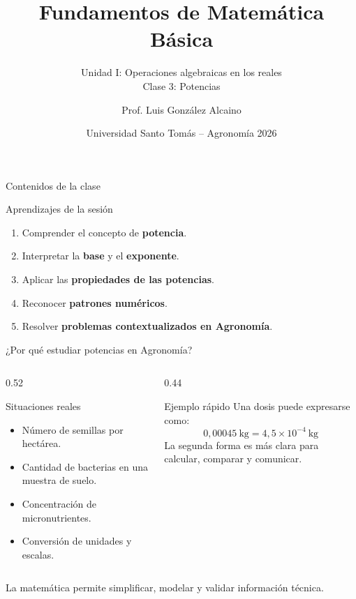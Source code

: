 \documentclass[aspectratio=169,10pt,handout]{beamer}
\title{Fundamentos de Matemática Básica}
\subtitle{Unidad I: Operaciones algebraicas en los reales\\Clase 3: Potencias}
\author{Prof. Luis González Alcaino}
\date{Universidad Santo Tomás -- Agronomía 2026}
\newcommand{\destacar}[1]{\textcolor{USTBlueDark}{\textbf{#1}}}
\begin{document}
	
	\begin{frame}
		\titlepage
	\end{frame}
	
	\begin{frame}{Contenidos de la clase}
		\begin{block}{Aprendizajes de la sesión}
			\begin{enumerate}
				\item Comprender el concepto de \destacar{potencia}.
				\item Interpretar la \destacar{base} y el \destacar{exponente}.
				\item Aplicar las \destacar{propiedades de las potencias}.
				\item Reconocer \destacar{patrones numéricos}.
				\item Resolver \destacar{problemas contextualizados en Agronomía}.
			\end{enumerate}
		\end{block}
	\end{frame}
	
	
	\begin{frame}{¿Por qué estudiar potencias en Agronomía?}
		\begin{columns}[T,totalwidth=\textwidth]
			\begin{column}{0.52\textwidth}
				\begin{block}{Situaciones reales}
					\begin{itemize}
						\item Número de semillas por hectárea.
						\item Cantidad de bacterias en una muestra de suelo.
						\item Concentración de micronutrientes.
						\item Conversión de unidades y escalas.
					\end{itemize}
				\end{block}
			\end{column}
			
			\begin{column}{0.44\textwidth}
				\begin{exampleblock}{Ejemplo rápido}
					Una dosis puede expresarse como:
					\[
					0{,}00045\ \text{kg}=4{,}5\times10^{-4}\ \text{kg}
					\]
					La segunda forma es más clara para calcular, comparar y comunicar.
				\end{exampleblock}
			\end{column}
		\end{columns}
		
		\vspace{0.2cm}
		\centering
		{\small \textcolor{WarmGray}{La matemática permite simplificar, modelar y validar información técnica.}}
	\end{frame}
	
\end{document}

